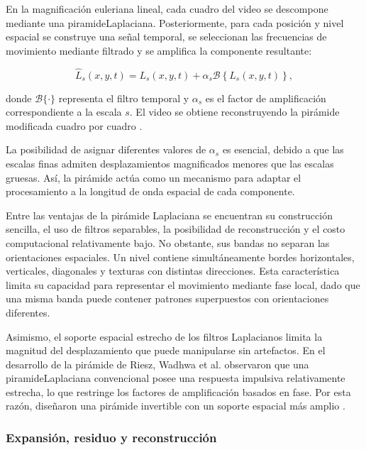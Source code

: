 En la magnificación euleriana lineal, cada cuadro del video se descompone mediante una \gls{piramideLaplaciana}. Posteriormente, para cada posición y nivel espacial se construye una señal temporal, se seleccionan las frecuencias de movimiento mediante filtrado y se amplifica la componente resultante:

\begin{equation}
    \widehat{L}_s(x,y,t)
    =
    L_s(x,y,t)
    +
    \alpha_s
    \mathcal{B}
    \left\{
        L_s(x,y,t)
    \right\},
    \label{eq:magnificacion_laplaciana}
\end{equation}

donde $\mathcal{B}\{\cdot\}$ representa el filtro temporal y $\alpha_s$ es el factor de amplificación correspondiente a la escala $s$. El video se obtiene reconstruyendo la pirámide modificada cuadro por cuadro \cite{wu2012eulerian}.

La posibilidad de asignar diferentes valores de $\alpha_s$ es esencial, debido a que las escalas finas admiten desplazamientos magnificados menores que las escalas gruesas. Así, la pirámide actúa como un mecanismo para adaptar el procesamiento a la longitud de onda espacial de cada componente.

Entre las ventajas de la pirámide Laplaciana se encuentran su construcción sencilla, el uso de filtros separables, la posibilidad de reconstrucción y el costo computacional relativamente bajo. No obstante, sus bandas no separan las orientaciones espaciales. Un nivel contiene simultáneamente bordes horizontales, verticales, diagonales y texturas con distintas direcciones. Esta característica limita su capacidad para representar el movimiento mediante fase local, dado que una misma banda puede contener patrones superpuestos con orientaciones diferentes.

Asimismo, el soporte espacial estrecho de los filtros Laplacianos limita la magnitud del desplazamiento que puede manipularse sin artefactos. En el desarrollo de la pirámide de Riesz, Wadhwa et al. observaron que una \gls{piramideLaplaciana} convencional posee una respuesta impulsiva relativamente estrecha, lo que restringe los factores de amplificación basados en fase. Por esta razón, diseñaron una pirámide invertible con un soporte espacial más amplio \cite{wadhwa2014riesz}.

\subsubsection{Expansión, residuo y reconstrucción}

